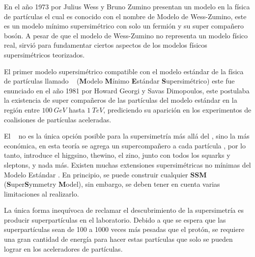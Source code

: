 
En el año 1973 por Julius Wess y Bruno Zumino presentan un modelo en la física de partículas el cual es conocido con el nombre de Modelo de Wess-Zumino, este es un modelo mínimo supersimétrico con solo un fermión y su super compañero bosón. A pesar de que el modelo de Wess-Zumino no representa un modelo físico real, sirvió para fundamentar ciertos aspectos de los modelos físicos supersimétricos teorizados. 


El primer modelo supersimétrico compatible con el modelo estándar de la física de partículas llamado \MSSM ~ (\textbf{M}odelo \textbf{M}ínimo \textbf{E}stándar \textbf{S}upersimétrico) este fue enunciado en el año 1981 por Howard Georgi y Savas Dimopoulos, este postulaba la existencia de super compañeros de las partículas del modelo estándar en la región entre $100~GeV$ hasta $1~TeV$, prediciendo su aparición en los experimentos de coalisiones de partículas aceleradas. %


El \MSSM ~ no es la única opción posible para la supersimetría más allá del \ME, sino la más económica, en esta teoría se agrega un supercompañero a cada partícula \ME, por lo tanto, introduce el higgsino, thewino, el zino, junto con todos los squarks y sleptons, y nada más. Existen muchas extensiones supersimétricas no mínimas del Modelo Estándar %
. En principio, se puede construir cualquier \textbf{SSM} (\textbf{S}uper\textbf{S}ymmetry \textbf{M}odel), sin embargo, se deben tener en cuenta varias limitaciones al realizarlo.

La única forma inequívoca de reclamar el descubrimiento de la supersimetría es producir superpartículas en el laboratorio. Debido a que se espera que las superpartículas sean de 100 a 1000 veces más pesadas que el protón, se requiere una gran cantidad de energía para hacer estas partículas que solo se pueden lograr en los aceleradores de partículas. %

